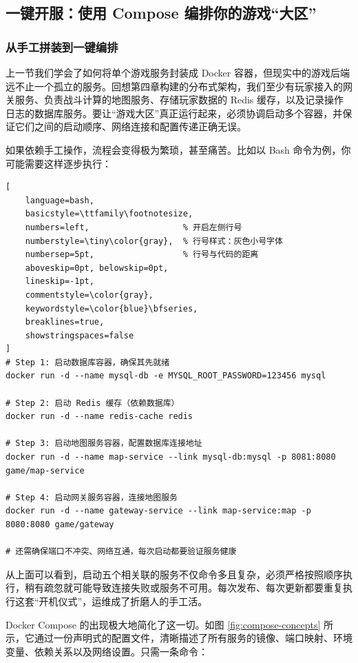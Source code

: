 \subsection{一键开服：使用 Compose 编排你的游戏``大区''}

\subsubsection{从手工拼装到一键编排}

上一节我们学会了如何将单个游戏服务封装成 Docker 容器，但现实中的游戏后端远不止一个孤立的服务。回想第四章构建的分布式架构，我们至少有玩家接入的网关服务、负责战斗计算的地图服务、存储玩家数据的 Redis 缓存，以及记录操作日志的数据库服务。要让“游戏大区”真正运行起来，必须协调启动多个容器，并保证它们之间的启动顺序、网络连接和配置传递正确无误。

如果依赖手工操作，流程会变得极为繁琐，甚至痛苦。比如以 Bash 命令为例，你可能需要这样逐步执行：

\begin{tcolorbox}[title=手工操作]
\begin{lstlisting}[
    language=bash,
    basicstyle=\ttfamily\footnotesize,
    numbers=left,                   % 开启左侧行号
    numberstyle=\tiny\color{gray},  % 行号样式：灰色小号字体
    numbersep=5pt,                  % 行号与代码的距离
    aboveskip=0pt, belowskip=0pt,
    lineskip=-1pt,
    commentstyle=\color{gray},
    keywordstyle=\color{blue}\bfseries,
    breaklines=true,
    showstringspaces=false
]
# Step 1: 启动数据库容器，确保其先就绪
docker run -d --name mysql-db -e MYSQL_ROOT_PASSWORD=123456 mysql

# Step 2: 启动 Redis 缓存（依赖数据库）
docker run -d --name redis-cache redis

# Step 3: 启动地图服务容器，配置数据库连接地址
docker run -d --name map-service --link mysql-db:mysql -p 8081:8080 game/map-service

# Step 4: 启动网关服务容器，连接地图服务
docker run -d --name gateway-service --link map-service:map -p 8080:8080 game/gateway

# 还需确保端口不冲突、网络互通，每次启动都要验证服务健康
\end{lstlisting}
\end{tcolorbox}

从上面可以看到，启动五个相关联的服务不仅命令多且复杂，必须严格按照顺序执行，稍有疏忽就可能导致连接失败或服务不可用。每次发布、每次更新都要重复执行这套“开机仪式”，运维成了折磨人的手工活。

Docker Compose 的出现极大地简化了这一切。如图 \ref{fig:compose-concepts} 所示，它通过一份声明式的配置文件，清晰描述了所有服务的镜像、端口映射、环境变量、依赖关系以及网络设置。只需一条命令：

